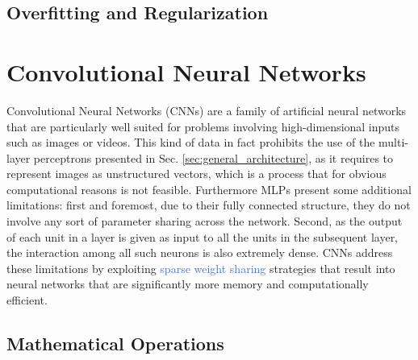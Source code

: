 \subsection{Overfitting and Regularization}
\label{sec:regularization}


\section{Convolutional Neural Networks}
\label{sec:convolutional_networks}

Convolutional Neural Networks (CNNs) are a family of artificial neural networks that are particularly well suited for problems involving high-dimensional inputs such as images or videos. This kind of data in fact prohibits the use of the multi-layer perceptrons presented in Sec. \ref{sec:general_architecture}, as it requires to represent images as unstructured vectors, which is a process that for obvious computational reasons is not feasible. Furthermore MLPs present some additional limitations: first and foremost, due to their fully connected structure, they do not involve any sort of parameter sharing across the network. Second, as the output of each unit in a layer is given as input to all the units in the subsequent layer, the interaction among all such neurons is also extremely dense. CNNs address these limitations by exploiting \textcolor{RoyalBlue}{sparse weight sharing} strategies that result into neural networks that are significantly more memory and computationally efficient. 

\subsection{Mathematical Operations}
\label{sec:operations}


